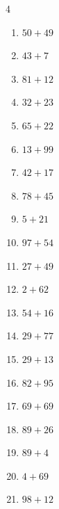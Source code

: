 \begin{multicols}{4}
\begin{enumerate}
  \item $50+49$
        \phantom{$=99$}

  \item $43+7$
        \phantom{$=50$}

  \item $81+12$
        \phantom{$=93$}

  \item $32+23$
        \phantom{$=55$}

  \item $65+22$
        \phantom{$=87$}

\columnbreak %

  \item $13+99$
        \phantom{$=112$}

  \item $42+17$
        \phantom{$=59$}

  \item $78+45$
        \phantom{$=123$}

  \item $5+21$
        \phantom{$=26$}

  \item $97+54$
        \phantom{$=151$}

  \item $27+49$
        \phantom{$=76$}

  \item $2+62$
        \phantom{$=64$}

  \item $54+16$
        \phantom{$=70$}

  \item $29+77$
        \phantom{$=106$}

  \item $29+13$
        \phantom{$=42$}

  \item $82+95$
        \phantom{$=177$}

  \item $69+69$
        \phantom{$=138$}

  \item $89+26$
        \phantom{$=115$}

  \item $89+4$
        \phantom{$=93$}

  \item $4+69$
        \phantom{$=73$}

  \item $98+12$
        \phantom{$=110$}


\end{enumerate}
\end{multicols}
